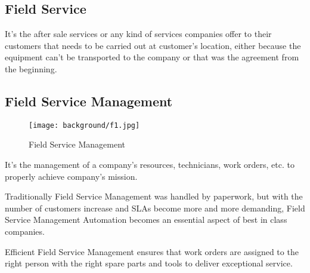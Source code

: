 \subsection{Field Service}
	It's the after sale services or any kind of services companies offer to their customers that needs to be carried out at customer's location, either because the equipment can't be transported to the company or that was the agreement from the beginning.\cite{field_service}
\subsection{Field Service Management}
	\begin{figure}[ht]
		\centering
		\texttt{[image: background/f1.jpg]}
		\caption{Field Service Management}
	\end{figure}
	It's the management of a company's resources, technicians, work orders, etc. to properly achieve company's mission.
	
	Traditionally Field Service Management was handled by paperwork, but with the number of customers increase and SLAs become more and more demanding, Field Service Management Automation becomes an essential aspect of best in class companies.
	
	Efficient Field Service Management ensures that work orders are assigned to the right person with the right spare parts and tools to deliver exceptional service.